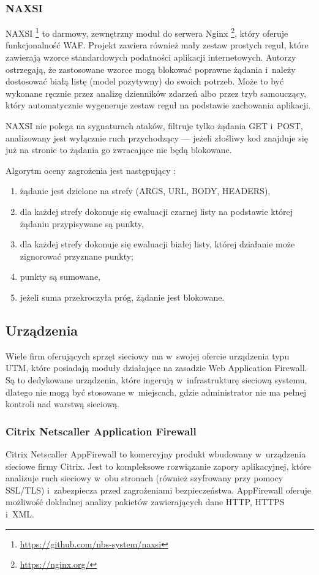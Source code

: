 \documentclass[12pt,a4paper,polish,thesis]{dcsbook}
\begin{document}
\subsubsection{NAXSI}
NAXSI \footnote{\url{https://github.com/nbs-system/naxsi}} to darmowy, zewnętrzny moduł do serwera Nginx \footnote{\url{https://nginx.org/}}, który oferuje funkcjonalność WAF. Projekt zawiera również mały zestaw prostych reguł, które zawierają wzorce standardowych podatności aplikacji internetowych. Autorzy ostrzegają, że zastosowane wzorce mogą blokować poprawne żądania i~należy dostosować białą listę (model pozytywny) do swoich potrzeb. Może to być wykonane ręcznie przez analizę dzienników zdarzeń albo przez tryb samouczący, który automatycznie wygeneruje zestaw reguł na podstawie zachowania aplikacji.

NAXSI nie polega na sygnaturach ataków, filtruje tylko żądania GET i~POST, analizowany jest wyłącznie ruch przychodzący --- jeżeli złośliwy kod znajduje się już na stronie to żądania go zwracające nie będą blokowane.

Algorytm oceny zagrożenia jest następujący \cite{naxsi-sekurak}:
\begin{enumerate}
\item żądanie jest dzielone na strefy (ARGS, URL, BODY, HEADERS),
\item dla każdej strefy dokonuje się ewaluacji czarnej listy na podstawie której żądaniu przypisywane są punkty,
\item dla każdej strefy dokonuje się ewaluacji białej listy, której działanie może zignorować przyznane punkty;
\item punkty są sumowane,
\item jeżeli suma przekroczyła próg, żądanie jest blokowane.
\end{enumerate}

\subsection{Urządzenia}
Wiele firm oferujących sprzęt sieciowy ma w~swojej ofercie urządzenia typu UTM, które posiadają moduły działające na zasadzie Web Application Firewall. Są to dedykowane urządzenia, które ingerują w~infrastrukturę sieciową systemu, dlatego nie mogą być stosowane w~miejscach, gdzie administrator nie ma pełnej kontroli nad warstwą sieciową.

\subsubsection{Citrix Netscaller Application Firewall}
Citrix Netscaller AppFirewall \cite{citrix} to komercyjny produkt wbudowany w~urządzenia sieciowe firmy Citrix. Jest to kompleksowe rozwiązanie zapory aplikacyjnej, które analizuje ruch sieciowy w~obu stronach (również szyfrowany przy pomocy SSL/TLS) i~zabezpiecza przed zagrożeniami bezpieczeństwa. AppFirewall oferuje możliwość dokładnej analizy pakietów zawierających dane HTTP, HTTPS i~XML.
\end{document}
